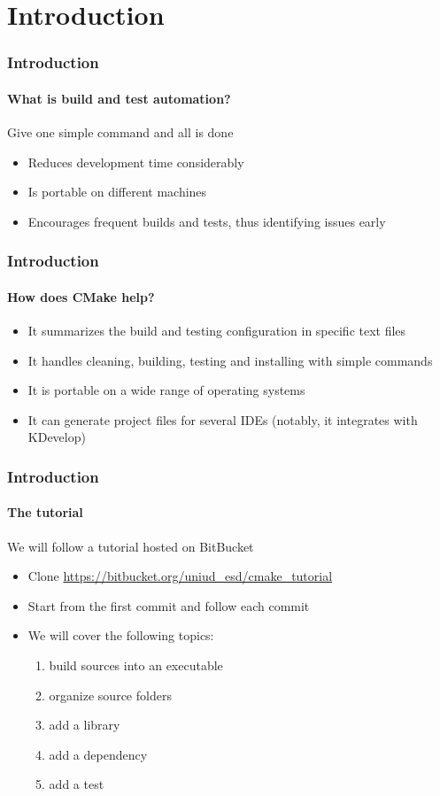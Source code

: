 \section{Introduction}

\begin{frame}
\frametitle{Introduction}
\framesubtitle{What is build and test automation?}

\begin{block}{Give one simple command and all is done}
\begin{itemize}
\item Reduces development time considerably
\item Is portable on different machines
\item Encourages frequent builds and tests, thus identifying issues early
\end{itemize}
\end{block}

\end{frame}

\begin{frame}
\frametitle{Introduction}
\framesubtitle{How does CMake help?}

\begin{itemize}
\item It summarizes the build and testing configuration in specific text files
\item It handles cleaning, building, testing and installing with simple commands
\item It is portable on a wide range of operating systems
\item It can generate project files for several IDEs (notably, it integrates with KDevelop)
\end{itemize}

\end{frame}

\begin{frame}
\frametitle{Introduction}
\framesubtitle{The tutorial}

\begin{block}{We will follow a tutorial hosted on BitBucket}
\begin{itemize}
\item Clone \url{https://bitbucket.org/uniud_esd/cmake_tutorial}
\item Start from the first commit and follow each commit
\item We will cover the following topics:
\begin{enumerate}
\item build sources into an executable
\item organize source folders
\item add a library
\item add a dependency 
\item add a test
\end{enumerate}
\end{itemize}
\end{block}
\end{frame}

